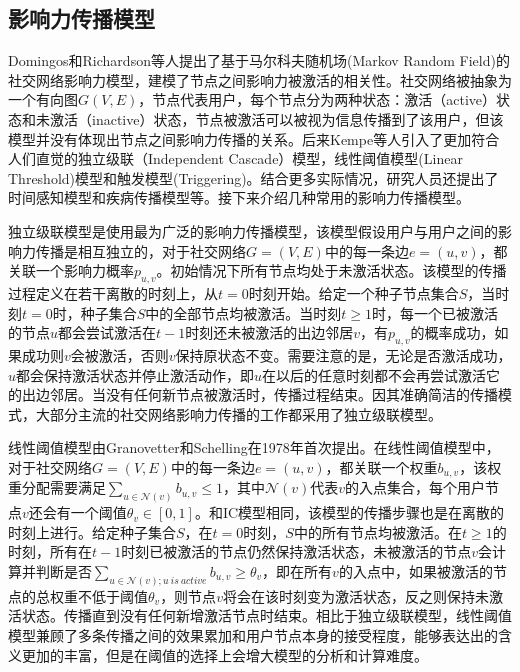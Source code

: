 \subsection{影响力传播模型}

Domingos和Richardson等人\cite{domingos2001mining}提出了基于马尔科夫随机场(Markov Random Field)的社交网络影响力模型，建模了节点之间影响力被激活的相关性。社交网络被抽象为一个有向图$G(V,E)$，节点代表用户，每个节点分为两种状态：激活（active）状态和未激活（inactive）状态，节点被激活可以被视为信息传播到了该用户，但该模型并没有体现出节点之间影响力传播的关系。后来Kempe等人\cite{kempe2003maximizing}引入了更加符合人们直觉的独立级联（Independent Cascade）模型，线性阈值模型(Linear Threshold)模型和触发模型(Triggering)。结合更多实际情况，研究人员还提出了时间感知模型\cite{chen2012time}和疾病传播模型\cite{shah2010detecting}等。接下来介绍几种常用的影响力传播模型。

独立级联模型是使用最为广泛的影响力传播模型，该模型假设用户与用户之间的影响力传播是相互独立的，对于社交网络$G=(V,E)$中的每一条边$e=(u,v)$，都关联一个影响力概率$p_{u,v}$。初始情况下所有节点均处于未激活状态。该模型的传播过程定义在若干离散的时刻上，从$t=0$时刻开始。给定一个种子节点集合$S$，当时刻$t=0$时，种子集合$S$中的全部节点均被激活。当时刻$t \ge 1$时，每一个已被激活的节点$u$都会尝试激活在$t-1$时刻还未被激活的出边邻居$v$，有$p_{u,v}$的概率成功，如果成功则$v$会被激活，否则$v$保持原状态不变。需要注意的是，无论是否激活成功，$u$都会保持激活状态并停止激活动作，即$u$在以后的任意时刻都不会再尝试激活它的出边邻居。当没有任何新节点被激活时，传播过程结束。因其准确简洁的传播模式，大部分主流的社交网络影响力传播的工作都采用了独立级联模型。

线性阈值模型由Granovetter和Schelling在1978年首次提出\cite{granovetter1978threshold}。在线性阈值模型中，对于社交网络$G=(V,E)$中的每一条边$e=(u,v)$，都关联一个权重$b_{u,v}$，该权重分配需要满足$\sum_{u \in \mathcal{N}(v)}b_{u,v}\le1$，其中$\mathcal{N}(v)$代表$v$的入点集合，每个用户节点$v$还会有一个阈值$\theta_v \in [0,1]$。和IC模型相同，该模型的传播步骤也是在离散的时刻上进行。给定种子集合$S$，在$t=0$时刻，$S$中的所有节点均被激活。在$t\ge1$的时刻，所有在$t-1$时刻已被激活的节点仍然保持激活状态，未被激活的节点$v$会计算并判断是否$\sum_{u \in \mathcal{N}(v);u \ is \ active} b_{u,v} \ge \theta_v$，即在所有$v$的入点中，如果被激活的节点的总权重不低于阈值$\theta_v$，则节点$v$将会在该时刻变为激活状态，反之则保持未激活状态。传播直到没有任何新增激活节点时结束。相比于独立级联模型，线性阈值模型兼顾了多条传播之间的效果累加和用户节点本身的接受程度，能够表达出的含义更加的丰富，但是在阈值的选择上会增大模型的分析和计算难度\cite{chen2013information}。

